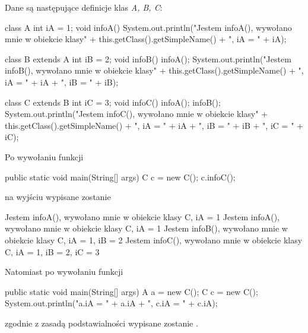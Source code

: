 \begin{example}
    Dane są następujące definicje klas \textit{A, B, C}:
    \begin{java}
        class A {
            int iA = 1;
            void infoA() {
                System.out.println("Jestem infoA(), wywołano mnie w obiekcie klasy" + 
                    this.getClass().getSimpleName() + ", iA = " + iA);
            }
        }
    
        class B extends A {
            int iB = 2;
            void infoB() {
                infoA();
                System.out.println("Jestem infoB(), wywołano mnie w obiekcie klasy" + 
                    this.getClass().getSimpleName() + ", iA = " + iA + ", iB = " + iB);
            }
        }
        
        class C extends B {
            int iC = 3;
            void infoC() {
                infoA();
                infoB();
                System.out.println("Jestem infoC(), wywołano mnie w obiekcie klasy" + 
                    this.getClass().getSimpleName() + ", iA = " + iA + ", iB = " + iB +
                    ", iC = " + iC);
            }
        }
    \end{java}

    Po wywołaniu funkcji
    \begin{java}
        public static void main(String[] args) {
            C c = new C();
            c.infoC();
        }
    \end{java}
    na wyjściu wypisane zostanie
    \begin{plain}
        Jestem infoA(), wywołano mnie w obiekcie klasy C, iA = 1
        Jestem infoA(), wywołano mnie w obiekcie klasy C, iA = 1
        Jestem infoB(), wywołano mnie w obiekcie klasy C, iA = 1, iB = 2
        Jestem infoC(), wywołano mnie w obiekcie klasy C, iA = 1, iB = 2, iC = 3
    \end{plain}

    Natomiast po wywołaniu funkcji
    \begin{java}
        public static void main(String[] args) {
            A a = new C();
            C c = new C();
            System.out.println("a.iA = " + a.iA + ", c.iA = " + c.iA);
        }
    \end{java}
    zgodnie z zasadą podstawialności wypisane zostanie .
\end{example}

